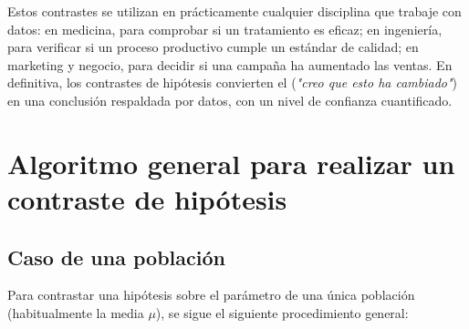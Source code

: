 \documentclass[11pt, a4paper]{article}
\begin{document}
Estos contrastes se utilizan en prácticamente cualquier disciplina que trabaje con datos: 
en medicina, para comprobar si un tratamiento es eficaz; en ingeniería, para verificar si 
un proceso productivo cumple un estándar de calidad; en marketing y negocio, para decidir 
si una campaña ha aumentado las ventas. En definitiva, los contrastes de hipótesis 
convierten el (\textit{"creo que esto ha cambiado"}) en una 
conclusión respaldada por datos, con un nivel de confianza cuantificado.

\section{Algoritmo general para realizar un contraste de hipótesis}

\subsection{Caso de una población}

Para contrastar una hipótesis sobre el parámetro de una única población (habitualmente la 
media $\mu$), se sigue el siguiente procedimiento general:
\end{document}
